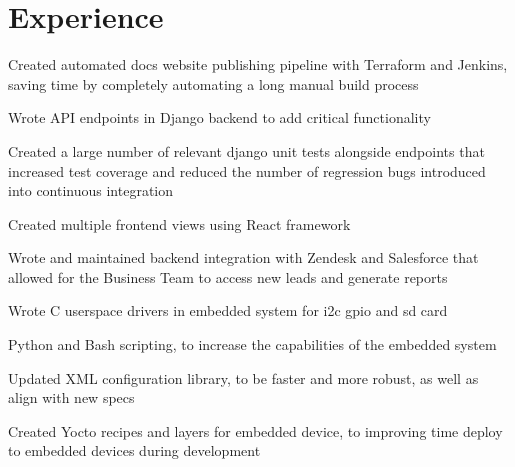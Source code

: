 \documentclass[]{deedy-resume-openfont}
\begin{document}
\begin{minipage}[t]{1.0\textwidth} 


\section{Experience}

\begin{tightemize}
\bigskip
\item Created automated docs website publishing pipeline with Terraform and Jenkins, saving time by completely automating a long manual build process
\item Wrote API endpoints in Django backend to add critical functionality
\item Created a large number of relevant django unit tests alongside endpoints that increased test coverage and reduced the number of regression bugs introduced into continuous integration 
\item Created multiple frontend views using React framework
\item Wrote and maintained backend integration with Zendesk and Salesforce that allowed for the Business Team to access new leads and generate reports
\end{tightemize}
\sectionsep

\begin{tightemize}
\item Wrote C userspace drivers in embedded system for i2c gpio and sd card
\item Python and Bash scripting, to increase the capabilities of the embedded system
\item Updated XML configuration library, to be faster and more robust, as well as align with new specs
\item Created Yocto recipes and layers for embedded device, to improving time deploy to embedded devices during development
\end{tightemize}
\sectionsep


\end{minipage}
\end{document}
